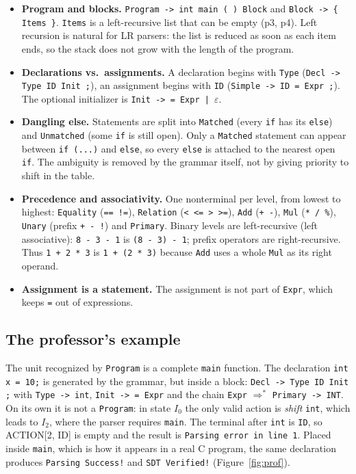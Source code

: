 \documentclass[11pt,letterpaper]{article}
\let\oldsubsection\subsection
\renewcommand{\subsection}{\needspace{6\baselineskip}\oldsubsection}
\newcommand{\tok}[1]{\texttt{#1}}
\newcommand{\ok}[1]{\textcolor{okgreen}{\texttt{#1}}}
\newcommand{\bad}[1]{\textcolor{errred}{\texttt{#1}}}
\begin{document}
\begin{itemize}
  \item \textbf{Program and blocks.} \texttt{Program -> int main ( ) Block}
        and \texttt{Block -> \{ Items \}}. \texttt{Items} is a left-recursive
        list that can be empty (p3, p4). Left recursion is natural for LR
        parsers: the list is reduced as soon as each item ends, so the stack
        does not grow with the length of the program.
  \item \textbf{Declarations vs.\ assignments.} A declaration begins with
        \texttt{Type} (\texttt{Decl -> Type ID Init ;}), an assignment begins
        with \tok{ID} (\texttt{Simple -> ID = Expr ;}). The optional
        initializer is \texttt{Init -> = Expr | $\varepsilon$}.
  \item \textbf{Dangling else.} Statements are split into \texttt{Matched}
        (every \texttt{if} has its \texttt{else}) and \texttt{Unmatched}
        (some \texttt{if} is still open). Only a \texttt{Matched} statement
        can appear between \texttt{if (...)} and \texttt{else}, so every
        \texttt{else} is attached to the nearest open \texttt{if}. The
        ambiguity is removed by the grammar itself, not by giving priority to
        shift in the table.
  \item \textbf{Precedence and associativity.} One nonterminal per level, from
        lowest to highest: \texttt{Equality} (\texttt{== !=}),
        \texttt{Relation} (\texttt{< <= > >=}), \texttt{Add} (\texttt{+ -}),
        \texttt{Mul} (\texttt{* / \%}), \texttt{Unary} (prefix \texttt{+ - !})
        and \texttt{Primary}. Binary levels are left-recursive (left
        associative): \texttt{8 - 3 - 1} is \texttt{(8 - 3) - 1}; prefix
        operators are right-recursive. Thus \texttt{1 + 2 * 3} is
        \texttt{1 + (2 * 3)} because \texttt{Add} uses a whole \texttt{Mul}
        as its right operand.
  \item \textbf{Assignment is a statement.} The assignment is not part of
        \texttt{Expr}, which keeps \texttt{=} out of expressions.
\end{itemize}

\subsection{The professor's example}
\label{sec:prof}

The unit recognized by \texttt{Program} is a complete \texttt{main} function.
The declaration \texttt{int x = 10;} is generated by the grammar, but inside
a block: \texttt{Decl -> Type ID Init ;} with \texttt{Type -> int},
\texttt{Init -> = Expr} and the chain \texttt{Expr} $\Rightarrow^{*}$
\texttt{Primary -> INT}. On its own it is not a \texttt{Program}: in state
$I_0$ the only valid action is \emph{shift} \tok{int}, which leads to
$I_2$, where the parser requires \tok{main}. The terminal after \tok{int} is
\tok{ID}, so ACTION[2, ID] is empty and the result is
\bad{Parsing error in line 1}. Placed inside \texttt{main}, which is how it
appears in a real C program, the same declaration produces
\ok{Parsing Success!} and \ok{SDT Verified!} (Figure~\ref{fig:prof}).
\end{document}
